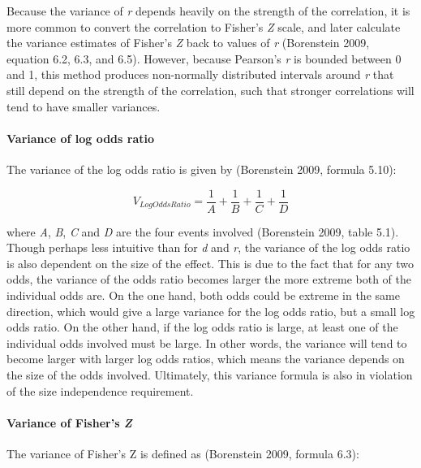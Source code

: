 \documentclass[]{article}
\let\oldparagraph\paragraph
\renewcommand{\paragraph}[1]{\oldparagraph{#1}\mbox{}}
\begin{document}
Because the variance of \emph{r} depends heavily on the strength of the
correlation, it is more common to convert the correlation to Fisher's
\emph{Z} scale, and later calculate the variance estimates of Fisher's
\emph{Z} back to values of \emph{r} (Borenstein 2009, equation 6.2, 6.3,
and 6.5). However, because Pearson's \emph{r} is bounded between 0 and
1, this method produces non-normally distributed intervals around
\emph{r} that still depend on the strength of the correlation, such that
stronger correlations will tend to have smaller variances.

\hypertarget{variance-of-log-odds-ratio}{%
\paragraph{Variance of log odds
ratio}\label{variance-of-log-odds-ratio}}

The variance of the log odds ratio is given by (Borenstein 2009, formula
5.10):

\[
\begin{equation}
V_{LogOddsRatio}=\frac{1}{A}+\frac{1}{B}+\frac{1}{C}+\frac{1}{D}
\label{eq:varlogoddsrat}
\tag{6}
\end{equation}
\]

where \emph{A}, \emph{B}, \emph{C} and \emph{D} are the four events
involved (Borenstein 2009, table 5.1). Though perhaps less intuitive
than for \emph{d} and \emph{r}, the variance of the log odds ratio is
also dependent on the size of the effect. This is due to the fact that
for any two odds, the variance of the odds ratio becomes larger the more
extreme both of the individual odds are. On the one hand, both odds
could be extreme in the same direction, which would give a large
variance for the log odds ratio, but a small log odds ratio. On the
other hand, if the log odds ratio is large, at least one of the
individual odds involved must be large. In other words, the variance
will tend to become larger with larger log odds ratios, which means the
variance depends on the size of the odds involved. Ultimately, this
variance formula is also in violation of the size independence
requirement.

\hypertarget{variance-of-fishers-z}{%
\paragraph{\texorpdfstring{Variance of Fisher's
\emph{Z}}{Variance of Fisher's Z}}\label{variance-of-fishers-z}}

The variance of Fisher's Z is defined as (Borenstein 2009, formula 6.3):
\end{document}
